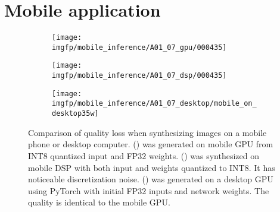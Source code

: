\section{Mobile application}
\label{appb:mobile-screenshots}

\begin{figure}[h]
	\centering
	\begin{subfigure}[b]{0.32\textwidth}
		\centering
		\texttt{[image: \\imgfp/mobile\_inference/A01\_07\_gpu/000435]}%
		\caption{}
		\label{fig:infer_gpu}
	\end{subfigure}
	\hfill
	\begin{subfigure}[b]{0.32\textwidth}
		\centering
		\texttt{[image: \\imgfp/mobile\_inference/A01\_07\_dsp/000435]}
		\caption{}
		\label{fig:infer_dsp}
	\end{subfigure}
	\hfill
	\begin{subfigure}[b]{0.32\textwidth}
		\centering
		\texttt{[image: \\imgfp/mobile\_inference/A01\_07\_desktop/mobile\_on\_desktop35w]}
		\caption{}
		\label{fig:infer_desktop}
	\end{subfigure}
	\caption{Comparison of quality loss when synthesizing images on a mobile phone or desktop computer. (\protect{}) was generated on mobile GPU from INT8 quantized input and FP32 weights. (\protect{}) was synthesized on mobile DSP with both input and weights quantized to INT8. It has noticeable discretization noise. (\protect{}) was generated on a desktop GPU using PyTorch with initial FP32 inputs and network weights. The quality is identical to the mobile GPU.}
	\label{fig:infer_different_devices}
\end{figure}
